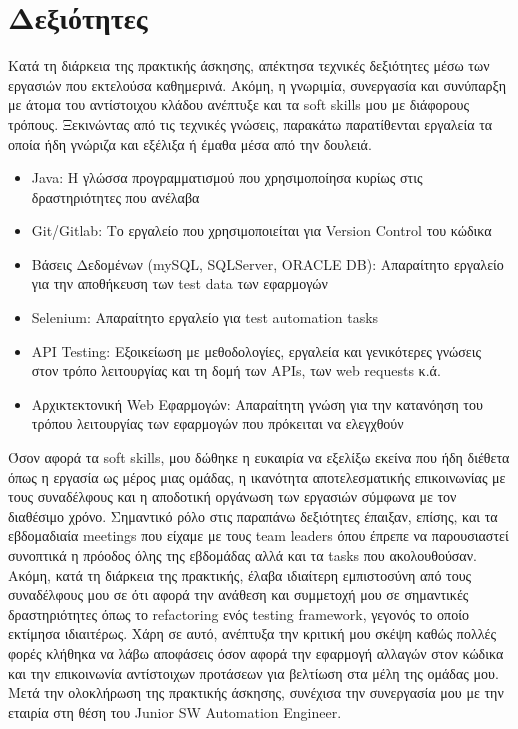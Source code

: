 \section{Δεξιότητες}
Κατά τη διάρκεια της πρακτικής άσκησης, απέκτησα τεχνικές δεξιότητες μέσω των εργασιών που εκτελούσα καθημερινά. Ακόμη, η γνωριμία, συνεργασία και συνύπαρξη με άτομα του αντίστοιχου κλάδου ανέπτυξε και τα 
soft skills μου με διάφορους τρόπους. Ξεκινώντας από τις τεχνικές γνώσεις, παρακάτω παρατίθενται εργαλεία τα οποία ήδη γνώριζα και εξέλιξα ή έμαθα μέσα από την δουλειά.
\begin{itemize}
    \item Java: Η γλώσσα προγραμματισμού που χρησιμοποίησα κυρίως στις δραστηριότητες που ανέλαβα
    \item Git/Gitlab: Το εργαλείο που χρησιμοποιείται για Version Control του κώδικα
    \item Βάσεις Δεδομένων (mySQL, SQLServer, ORACLE DB): Απαραίτητο εργαλείο για την αποθήκευση των test data των εφαρμογών
    \item Selenium: Απαραίτητο εργαλείο για test automation tasks
    \item API Testing: Εξοικείωση με μεθοδολογίες, εργαλεία και γενικότερες γνώσεις στον τρόπο λειτουργίας και τη δομή των APIs, των web requests κ.ά.
    \item Αρχικτεκτονική Web Εφαρμογών: Απαραίτητη γνώση για την κατανόηση του τρόπου λειτουργίας των εφαρμογών που πρόκειται να ελεγχθούν
\end{itemize}

Όσον αφορά τα soft skills, μου δώθηκε η ευκαιρία να εξελίξω εκείνα που ήδη διέθετα όπως η εργασία ως μέρος μιας ομάδας, η ικανότητα αποτελεσματικής επικοινωνίας με τους συναδέλφους και 
η αποδοτική οργάνωση των εργασιών σύμφωνα με τον διαθέσιμο χρόνο. Σημαντικό ρόλο στις παραπάνω δεξιότητες έπαιξαν, επίσης, και τα εβδομαδιαία meetings που είχαμε με τους team leaders όπου έπρεπε να παρουσιαστεί 
συνοπτικά η πρόοδος όλης της εβδομάδας αλλά και τα tasks που ακολουθούσαν. Ακόμη, κατά τη διάρκεια της πρακτικής, έλαβα ιδιαίτερη εμπιστοσύνη από τους συναδέλφους μου σε ότι αφορά την ανάθεση και συμμετοχή μου σε 
σημαντικές δραστηριότητες όπως το refactoring ενός testing framework, γεγονός το οποίο εκτίμησα ιδιαιτέρως. Χάρη σε αυτό, ανέπτυξα την κριτική μου σκέψη καθώς πολλές φορές κλήθηκα να λάβω αποφάσεις  
όσον αφορά την εφαρμογή αλλαγών στον κώδικα και την επικοινωνία αντίστοιχων προτάσεων για βελτίωση στα μέλη της ομάδας μου.\\

Μετά την ολοκλήρωση της πρακτικής άσκησης, συνέχισα την συνεργασία μου με την εταιρία στη θέση του Junior SW Automation Engineer.
